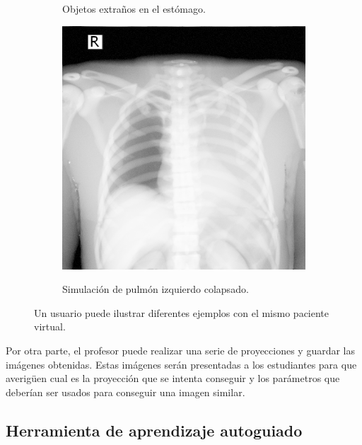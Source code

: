 \begin{figure}[ht]
\begin{subfigure}[b]{0.3\linewidth}
        \caption{Objetos extraños en el estómago.}
    \end{subfigure}
    \null\hfill
     \begin{subfigure}[b]{0.3\linewidth}
        \centering
        {\includegraphics[width=\linewidth]{IMG/HVPLung.png}}
        \caption{Simulación de pulmón izquierdo colapsado.}
    \end{subfigure}
    \caption{\label{fig:disease} Un usuario puede ilustrar diferentes ejemplos con el mismo paciente virtual.}
   \end{figure}
   
   
Por otra parte, el profesor puede realizar una serie de proyecciones y guardar las imágenes obtenidas. Estas imágenes serán presentadas a los estudiantes para que averigüen cual es la proyección que se intenta conseguir y los parámetros que deberían ser usados para conseguir una imagen similar.

\subsection{Herramienta de aprendizaje autoguiado}

